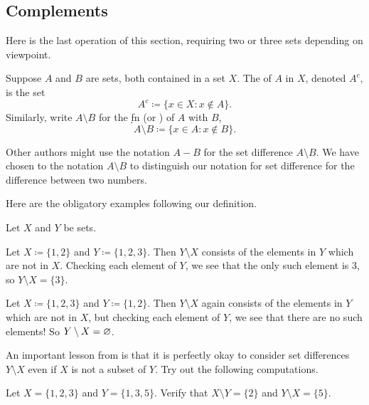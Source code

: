 \documentclass[../notes.tex]{subfiles}
\begin{document}
\subsection{Complements}
Here is the last operation of this section, requiring two or three sets depending on viewpoint.
\begin{definition}[complement]
    Suppose $A$ and $B$ are sets, both contained in a set $X$. The  of $A$ in $X$, denoted $A^c$, is the set
    \[A^c \coloneqq \{x \in X: x \notin A\}.\]
    Similarly, write $A \setminus B$ for the \d{fn} (or ) of $A$ with $B$,
    \[A \setminus B \coloneqq \{x \in A : x \notin B\}.\]
\end{definition}
\begin{remark}
    Other authors might use the notation $A-B$ for the set difference $A\setminus B$. We have chosen to the notation $A\setminus B$ to distinguish our notation for set difference for the difference between two numbers.
\end{remark}
Here are the obligatory examples following our definition.
\begin{example} \label{ex:set-diff}
    Let $X$ and $Y$ be sets.
    \begin{listalph}
        \item Let $X\coloneqq\{1,2\}$ and $Y\coloneqq\{1,2,3\}$. Then $Y\setminus X$ consists of the elements in $Y$ which are not in $X$. Checking each element of $Y$, we see that the only such element is $3$, so $Y\setminus X=\{3\}$.
        \item Let $X\coloneqq\{1,2,3\}$ and $Y\coloneqq\{1,2\}$. Then $Y\setminus X$ again consists of the elements in $Y$ which are not in $X$, but checking each element of $Y$, we see that there are no such elements! So $Y\setminus X=\varnothing$.
    \end{listalph}
\end{example}
An important lesson from  is that it is perfectly okay to consider set differences $Y\setminus X$ even if $X$ is not a subset of $Y$. Try out the following computations.
\begin{exercise}
    Let $X=\{1,2,3\}$ and $Y=\{1,3,5\}$. Verify that $X\setminus Y=\{2\}$ and $Y\setminus X=\{5\}$.
\end{exercise}
\end{document}
